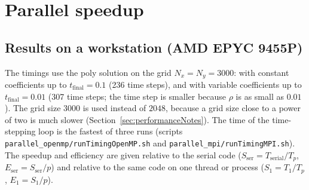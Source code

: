 \documentclass[11pt]{article}
\begin{document}
\section{Parallel speedup}
\subsection{Results on a workstation (AMD EPYC 9455P)}
The timings use the poly solution on the grid $N_x=N_y=3000$: with constant coefficients up to $t_{\text{final}}=0.1$ (236 time steps), and with variable coefficients up to $t_{\text{final}}=0.01$ (307 time steps; the time step is smaller because $\rho$ is as small as $0.01$). The grid size $3000$ is used instead of $2048$, because a grid size close to a power of two is much slower (Section~\ref{sec:performanceNotes}). The time of the time-stepping loop is the fastest of three runs (scripts \texttt{parallel\_openmp/runTimingOpenMP.sh} and \texttt{parallel\_mpi/runTimingMPI.sh}). The speedup and efficiency are given relative to the serial code ($S_{\text{ser}}=T_{\text{serial}}/T_p$, $E_{\text{ser}}=S_{\text{ser}}/p$) and relative to the same code on one thread or process ($S_1=T_1/T_p$, $E_1=S_1/p$).
\end{document}
